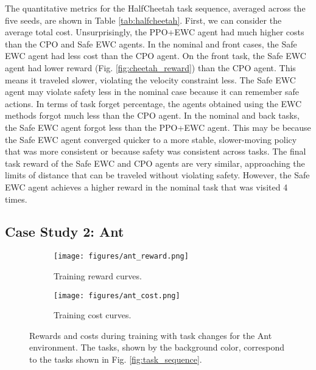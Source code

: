 The quantitative metrics for the HalfCheetah task sequence, averaged across the five seeds, are shown in Table \ref{tab:halfcheetah}. First, we can consider the average total cost. Unsurprisingly, the PPO+EWC agent had much higher costs than the CPO and Safe EWC agents. In the nominal and front cases, the Safe EWC agent had less cost than the CPO agent. On the front task, the Safe EWC agent had lower reward (Fig. \ref{fig:cheetah_reward}) than the CPO agent. This means it traveled slower, violating the velocity constraint less. The Safe EWC agent may violate safety less in the nominal case because it can remember safe actions. In terms of task forget percentage, the agents obtained using the EWC methods forgot much less than the CPO agent. In the nominal and back tasks, the Safe EWC agent forgot less than the PPO+EWC agent. This may be because the Safe EWC agent converged quicker to a more stable, slower-moving policy that was more consistent or because safety was consistent across tasks. The final task reward of the Safe EWC and CPO agents are very similar, approaching the limits of distance that can be traveled without violating safety. However, the Safe EWC agent achieves a higher reward in the nominal task that was visited 4 times.

\subsection{Case Study 2: Ant}

\begin{figure}[t]
    \centering
    \begin{subfigure}[b]{\columnwidth}
        \centering
        \texttt{[image: figures/ant\_reward.png]} %
        \caption{Training reward curves.}
        \label{fig:ant_reward}
    \end{subfigure}
    
    
    \begin{subfigure}[b]{\columnwidth}
        \centering
        \texttt{[image: figures/ant\_cost.png]} %
        \caption{Training cost curves.}
        \label{fig:ant_cost}
    \end{subfigure}
    
    \caption{Rewards and costs during training with task changes for the Ant environment. The tasks, shown by the background color, correspond to the tasks shown in Fig. \ref{fig:task_sequence}.}
    \label{fig:ant_train}
\end{figure}


